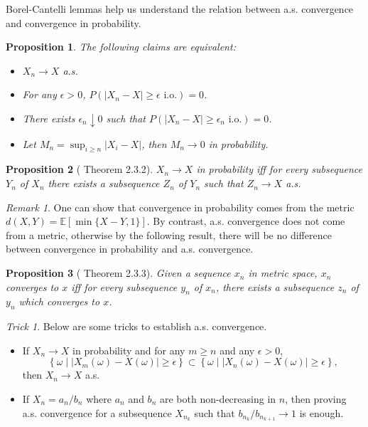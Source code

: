 \documentclass[openany]{book}
\newtheorem{proposition}{Proposition}[chapter]
\theoremstyle{definition}
\theoremstyle{remark}
\newtheorem*{remark}{Remark}
\newtheorem*{trick}{Trick}
\begin{document}
Borel-Cantelli lemmas help us understand the relation between a.s. convergence and convergence in probability.
\begin{proposition}
    The following claims are equivalent:
    \begin{itemize}
        \item $X_n\to X$ a.s.
        \item For any $\epsilon>0$, $P\left(|X_n-X|\ge\epsilon\textrm{ i.o.}\right)=0$.
        \item There exists $\epsilon_n\downarrow0$ such that $P\left(|X_n-X|\ge\epsilon_n\textrm{ i.o.}\right)=0$.
        \item Let $M_n=\sup_{i\ge n}|X_i-X|$, then $M_n\to0$ in probability.
    \end{itemize}
\end{proposition}
\begin{proposition}[\cite{D10} Theorem 2.3.2]
    $X_n\to X$ in probability iff for every subsequence $Y_n$ of $X_n$ there exists a subsequence $Z_n$ of $Y_n$ such that $Z_n\to X$ a.s.
\end{proposition}
\begin{remark}
    One can show that convergence in probability comes from the metric $d(X,Y)=\mathbb{E}\left[\min\{X-Y,1\}\right]$. By contrast, a.s. convergence does not come from a metric, otherwise by the following result, there will be no difference between convergence in probability and a.s. convergence.
\end{remark}
\begin{proposition}[\cite{D10} Theorem 2.3.3]
    Given a sequence $x_n$ in metric space, $x_n$ converges to $x$ iff for every subsequence $y_n$ of $x_n$, there exists a subsequence $z_n$ of $y_n$ which converges to $x$.
\end{proposition}
\begin{trick}
    Below are some tricks to establish a.s. convergence.
    \begin{itemize}
        \item If $X_n\to X$ in probability and for any $m\ge n$ and any $\epsilon>0$,
        \begin{equation*}
            \left\{\omega\middle||X_m(\omega)-X(\omega)|\ge\epsilon\right\}\subset\left\{\omega\middle||X_n(\omega)-X(\omega)|\ge\epsilon\right\},
        \end{equation*}
        then $X_n\to X$ a.s.

        \item If $X_n=a_n/b_n$ where $a_n$ and $b_n$ are both non-decreasing in $n$, then proving a.s. convergence for a subsequence $X_{n_k}$ such that $b_{n_k}/b_{n_{k+1}}\to1$ is enough.
    \end{itemize}
\end{trick}
\end{document}
